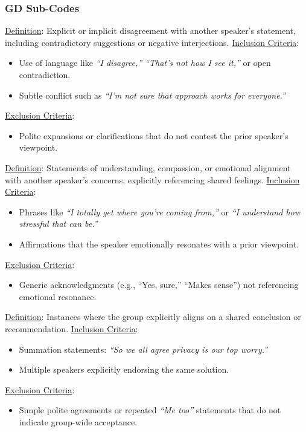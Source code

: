 \documentclass[acmsmall]{acmart}
\begin{document}
\subsubsection{GD Sub-Codes}

\begin{description}[leftmargin=1.2em,labelsep=0.6em]
\item[\textbf{GD-Conflict}]
\underline{Definition}: Explicit or implicit disagreement with another speaker’s statement, including contradictory suggestions or negative interjections.
\newline
\underline{Inclusion Criteria}:
\begin{itemize}
  \item Use of language like \emph{“I disagree,” “That’s not how I see it,”} or open contradiction.
  \item Subtle conflict such as \emph{“I’m not sure that approach works for everyone.”}
\end{itemize}
\underline{Exclusion Criteria}:
\begin{itemize}
  \item Polite expansions or clarifications that do not contest the prior speaker’s viewpoint.
\end{itemize}

\item[\textbf{GD-Empathy}]
\underline{Definition}: Statements of understanding, compassion, or emotional alignment with another speaker’s concerns, explicitly referencing shared feelings.
\newline
\underline{Inclusion Criteria}:
\begin{itemize}
  \item Phrases like \emph{“I totally get where you’re coming from,”} or \emph{“I understand how stressful that can be.”}
  \item Affirmations that the speaker emotionally resonates with a prior viewpoint.
\end{itemize}
\underline{Exclusion Criteria}:
\begin{itemize}
  \item Generic acknowledgments (e.g., “Yes, sure,” “Makes sense”) not referencing emotional resonance.
\end{itemize}

\item[\textbf{GD-Consensus}]
\underline{Definition}: Instances where the group explicitly aligns on a shared conclusion or recommendation.
\newline
\underline{Inclusion Criteria}:
\begin{itemize}
  \item Summation statements: \emph{“So we all agree privacy is our top worry.”}
  \item Multiple speakers explicitly endorsing the same solution.
\end{itemize}
\underline{Exclusion Criteria}:
\begin{itemize}
  \item Simple polite agreements or repeated \emph{“Me too”} statements that do not indicate group-wide acceptance.
\end{itemize}


\end{description}
\end{document}
